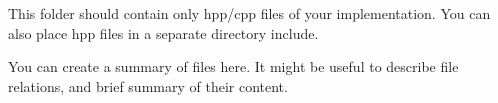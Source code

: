 This folder should contain only hpp/cpp files of your implementation. You can also place hpp files in a separate directory {\ttfamily include}.

You can create a summary of files here. It might be useful to describe file relations, and brief summary of their content. 